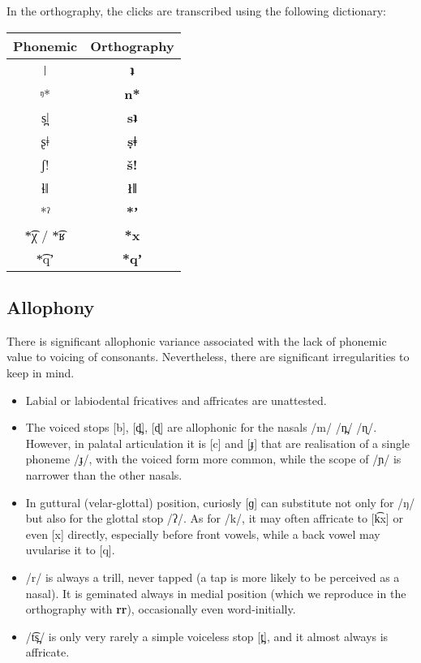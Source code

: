 \documentclass[11pt]{book}
\newcommand{\qcn}[1]{\textbf{#1}}
\begin{document}
In the orthography, the clicks are transcribed using the following dictionary:

\begin{center}
\begin{tabular}{c|c}
Phonemic & Orthography \\ \hline \hline
ǀ & \qcn{ʇ}\\
ᵑ* & \qcn{n*}\\
s̪ǀ & \qcn{sʇ} \\
ʂǂ & \qcn{ṣǂ} \\
ʃ! &	\qcn{š!} \\
ɬǁ & \qcn{łǁ}\\
*ˀ & \qcn{*ʼ}\\
*͡χ / *͡ʁ & \qcn{*x} \\
*͡qʼ & \qcn{*qʼ}
\end{tabular}
\end{center}

\subsection{Allophony}\label{sec:allophony}

There is significant allophonic variance associated with the lack of phonemic value to voicing of consonants. Nevertheless, there are significant irregularities to keep in mind.

\begin{itemize}
	\item Labial or labiodental fricatives and affricates are unattested.
	\item The voiced stops [b], [d̪], [ɖ] are allophonic for the nasals /m/ /n̪/ /ɳ/. However, in palatal articulation it is [c] and [ɟ] that are realisation of a single phoneme /ɟ/, with the voiced form more common, while the scope of /ɲ/ is narrower than the other nasals.
	\item In guttural (velar-glottal) position, curiosly [ɡ] can substitute not only for /ŋ/ but also for the glottal stop /ʔ/. As for /k/, it may often affricate to [k͡x] or even [x] directly, especially before front vowels, while a back vowel may uvularise it to [q].
	\item /r/ is always a trill, never tapped (a tap is more likely to be perceived as a nasal). It is geminated always in medial position (which we reproduce in the orthography with \qcn{rr}), occasionally even word-initially.
	\item /t͡s̪/ is only very rarely a simple voiceless stop [t̪], and it almost always is affricate.
\end{itemize}
\end{document}
